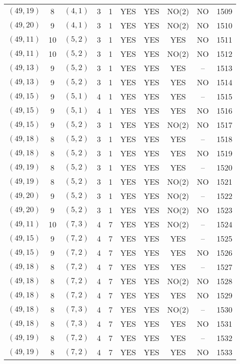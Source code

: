 \begin{longtable}{|c|c|c|c|c|c|c|c|c|c|}
$(49, 19)$ & 8 & $(4, 1)$ & 3 & 1 & YES & YES & NO(2) & NO & 1509\\
$(49, 20)$ & 9 & $(4, 1)$ & 3 & 1 & YES & YES & NO(2) & NO & 1510\\
$(49, 11)$ & 10 & $(5, 2)$ & 3 & 1 & YES & YES & YES & NO & 1511\\
$(49, 11)$ & 10 & $(5, 2)$ & 3 & 1 & YES & YES & NO(2) & NO & 1512\\
$(49, 13)$ & 9 & $(5, 2)$ & 3 & 1 & YES & YES & YES & -- & 1513\\
$(49, 13)$ & 9 & $(5, 2)$ & 3 & 1 & YES & YES & YES & NO & 1514\\
$(49, 15)$ & 9 & $(5, 1)$ & 4 & 1 & YES & YES & YES & -- & 1515\\
$(49, 15)$ & 9 & $(5, 1)$ & 4 & 1 & YES & YES & YES & NO & 1516\\
$(49, 15)$ & 9 & $(5, 2)$ & 3 & 1 & YES & YES & NO(2) & NO & 1517\\
$(49, 18)$ & 8 & $(5, 2)$ & 3 & 1 & YES & YES & YES & -- & 1518\\
$(49, 18)$ & 8 & $(5, 2)$ & 3 & 1 & YES & YES & YES & NO & 1519\\
$(49, 19)$ & 8 & $(5, 2)$ & 3 & 1 & YES & YES & YES & -- & 1520\\
$(49, 19)$ & 8 & $(5, 2)$ & 3 & 1 & YES & YES & NO(2) & NO & 1521\\
$(49, 20)$ & 9 & $(5, 2)$ & 3 & 1 & YES & YES & NO(2) & -- & 1522\\
$(49, 20)$ & 9 & $(5, 2)$ & 3 & 1 & YES & YES & NO(2) & NO & 1523\\
$(49, 11)$ & 10 & $(7, 3)$ & 4 & 7 & YES & YES & NO(2) & -- & 1524\\
$(49, 15)$ & 9 & $(7, 2)$ & 4 & 7 & YES & YES & YES & -- & 1525\\
$(49, 15)$ & 9 & $(7, 2)$ & 4 & 7 & YES & YES & YES & NO & 1526\\
$(49, 18)$ & 8 & $(7, 2)$ & 4 & 7 & YES & YES & YES & -- & 1527\\
$(49, 18)$ & 8 & $(7, 2)$ & 4 & 7 & YES & YES & NO(2) & NO & 1528\\
$(49, 18)$ & 8 & $(7, 2)$ & 4 & 7 & YES & YES & YES & NO & 1529\\
$(49, 18)$ & 8 & $(7, 3)$ & 4 & 7 & YES & YES & NO(2) & -- & 1530\\
$(49, 18)$ & 8 & $(7, 3)$ & 4 & 7 & YES & YES & YES & NO & 1531\\
$(49, 19)$ & 8 & $(7, 2)$ & 4 & 7 & YES & YES & YES & -- & 1532\\
$(49, 19)$ & 8 & $(7, 2)$ & 4 & 7 & YES & YES & YES & NO & 1533\\

\end{longtable}
